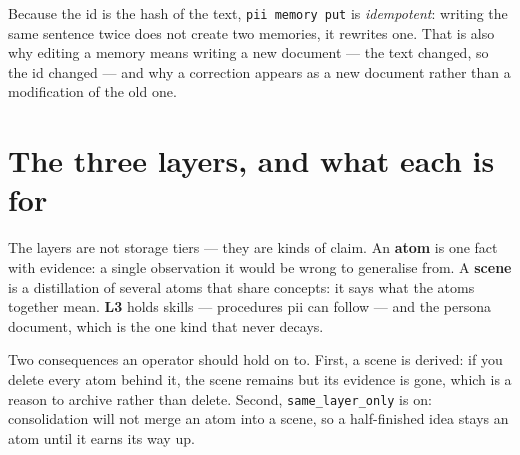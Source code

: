 Because the id is the hash of the text, \texttt{pii memory put} is \emph{idempotent}: writing the
same sentence twice does not create two memories, it rewrites one. That is also why editing a
memory means writing a new document — the text changed, so the id changed — and why a correction
appears as a new document rather than a modification of the old one.

\section{The three layers, and what each is for}

\begin{center}
\end{center}

The layers are not storage tiers — they are kinds of claim. An \textbf{atom} is one fact with
evidence: a single observation it would be wrong to generalise from. A \textbf{scene} is a
distillation of several atoms that share concepts: it says what the atoms together mean. \textbf{L3}
holds skills --- procedures pii can follow --- and the persona document, which is the one kind that
never decays.

Two consequences an operator should hold on to. First, a scene is derived: if you delete every
atom behind it, the scene remains but its evidence is gone, which is a reason to archive rather
than delete. Second, \texttt{same\_layer\_only} is on: consolidation will not merge an atom into
a scene, so a half-finished idea stays an atom until it earns its way up.

